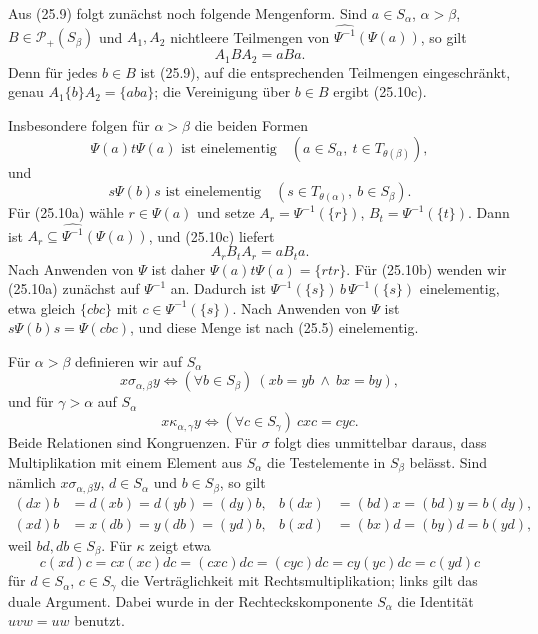 \documentclass[main.tex]{subfiles}
\begin{document}
Aus (25.9) folgt zunächst noch folgende Mengenform.  Sind
\(a\in S_\alpha\), \(\alpha>\beta\),
\(B\in\mathcal P_+(S_\beta)\) und
\(A_1,A_2\) nichtleere Teilmengen von
\(\widehat{\Psi^{-1}}(\Psi(a))\), so gilt
\[
  A_1BA_2=aBa.                                             \tag{25.10c}
\]
Denn für jedes \(b\in B\) ist (25.9), auf die entsprechenden
Teilmengen eingeschränkt, genau
\(A_1\{b\}A_2=\{aba\}\); die Vereinigung über \(b\in B\) ergibt
(25.10c).

Insbesondere folgen für \(\alpha>\beta\) die beiden Formen
\[
 \Psi(a)t\Psi(a)\text{ ist einelementig}
 \quad(a\in S_\alpha,\ t\in T_{\theta(\beta)}),           \tag{25.10a}
\]
und
\[
 s\Psi(b)s\text{ ist einelementig}
 \quad(s\in T_{\theta(\alpha)},\ b\in S_\beta).          \tag{25.10b}
\]
Für (25.10a) wähle \(r\in\Psi(a)\) und setze
\(A_r=\Psi^{-1}(\{r\})\),
\(B_t=\Psi^{-1}(\{t\})\).  Dann ist
\(A_r\subseteq\widehat{\Psi^{-1}}(\Psi(a))\), und (25.10c) liefert
\[
 A_rB_tA_r=aB_ta.
\]
Nach Anwenden von \(\Psi\) ist daher
\(\Psi(a)t\Psi(a)=\{rtr\}\).  Für (25.10b) wenden wir (25.10a)
zunächst auf \(\Psi^{-1}\) an.  Dadurch ist
\(\Psi^{-1}(\{s\})\,b\,\Psi^{-1}(\{s\})\) einelementig, etwa gleich
\(\{cbc\}\) mit \(c\in\Psi^{-1}(\{s\})\).  Nach Anwenden von \(\Psi\)
ist \(s\Psi(b)s=\Psi(cbc)\), und diese Menge ist nach (25.5)
einelementig.

Für \(\alpha>\beta\) definieren wir auf \(S_\alpha\)
\[
 x\mathrel{\sigma_{\alpha,\beta}}y
 \iff
 (\forall b\in S_\beta)\ (xb=yb\ \land\ bx=by),          \tag{25.11}
\]
und für \(\gamma>\alpha\) auf \(S_\alpha\)
\[
 x\mathrel{\kappa_{\alpha,\gamma}}y
 \iff
 (\forall c\in S_\gamma)\ cxc=cyc.                      \tag{25.12}
\]
Beide Relationen sind Kongruenzen.  Für \(\sigma\) folgt dies unmittelbar
daraus, dass Multiplikation mit einem Element aus \(S_\alpha\) die
Testelemente in \(S_\beta\) belässt.  Sind nämlich
\(x\mathrel{\sigma_{\alpha,\beta}}y\),
\(d\in S_\alpha\) und \(b\in S_\beta\), so gilt
\[
\begin{aligned}
 (dx)b&=d(xb)=d(yb)=(dy)b,&
 b(dx)&=(bd)x=(bd)y=b(dy),\\
 (xd)b&=x(db)=y(db)=(yd)b,&
 b(xd)&=(bx)d=(by)d=b(yd),
\end{aligned}
\]
weil \(bd,db\in S_\beta\).  Für \(\kappa\) zeigt etwa
\[
 c(xd)c=cx(xc)dc=(cxc)dc=(cyc)dc=cy(yc)dc=c(yd)c
\]
für \(d\in S_\alpha\), \(c\in S_\gamma\) die Verträglichkeit mit
Rechtsmultiplikation; links gilt das duale Argument.  Dabei wurde in der
Rechteckskomponente \(S_\alpha\) die Identität \(uvw=uw\) benutzt.
\end{document}
